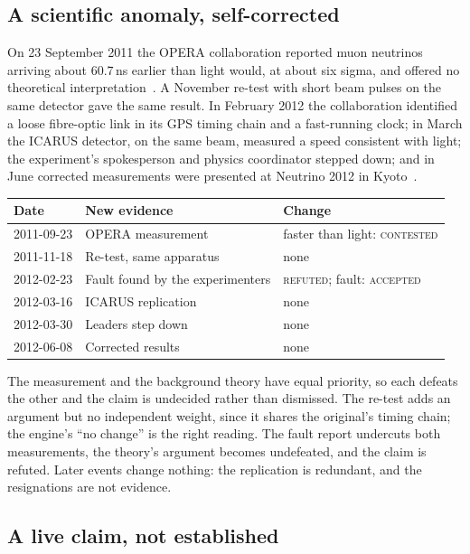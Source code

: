 \documentclass[11pt]{article}
\begin{document}
\subsection{A scientific anomaly, self-corrected}

On 23 September 2011 the OPERA collaboration reported muon neutrinos
arriving about 60.7\,ns earlier than light would, at about six sigma, and
offered no theoretical interpretation~\cite{operawiki}. A November re-test
with short beam pulses on the same detector gave the same result. In
February 2012 the collaboration identified a loose fibre-optic link in
its GPS timing chain and a fast-running clock; in March the ICARUS
detector, on the same beam, measured a speed consistent with light; the
experiment's spokesperson and physics coordinator stepped down; and in
June corrected measurements were presented at Neutrino 2012 in
Kyoto~\cite{operawiki}.

\begin{center}\small
\begin{tabularx}{\linewidth}{@{}l X l@{}}
\toprule
Date & New evidence & Change\\
\midrule
2011-09-23 & OPERA measurement & faster than light: \textsc{contested}\\
2011-11-18 & Re-test, same apparatus & none\\
2012-02-23 & Fault found by the experimenters & \textsc{refuted}; fault: \textsc{accepted}\\
2012-03-16 & ICARUS replication & none\\
2012-03-30 & Leaders step down & none\\
2012-06-08 & Corrected results & none\\
\bottomrule
\end{tabularx}
\end{center}

The measurement and the background theory have equal priority, so each
defeats the other and the claim is undecided rather than dismissed. The
re-test adds an argument but no independent weight, since it shares the
original's timing chain; the engine's ``no change'' is the right reading.
The fault report undercuts both measurements, the theory's argument
becomes undefeated, and the claim is refuted. Later events change
nothing: the replication is redundant, and the resignations are not
evidence.

\subsection{A live claim, not established}
\end{document}
